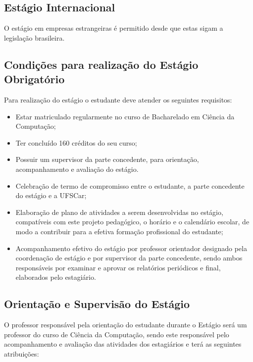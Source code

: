  
\subsection{Estágio Internacional}
O estágio em empresas estrangeiras é permitido desde que estas sigam a legislação brasileira. 


\subsection{Condições para realização do Estágio Obrigatório}

Para realização do estágio o estudante deve atender os seguintes requisitos:

\begin{itemize}
\item Estar matriculado regularmente no curso de Bacharelado em Ciência da Computação;
\item 	Ter concluído 160 créditos do seu curso;
\item 	Possuir um supervisor da parte concedente, para orientação, acompanhamento e avaliação do estágio.
\item Celebração de termo de compromisso entre o estudante, a parte concedente do estágio e a UFSCar; 
\item Elaboração de plano de atividades a serem desenvolvidas no estágio, compatíveis com este projeto pedagógico, o horário e o calendário escolar, de modo a contribuir para a efetiva formação profissional do estudante;
\item Acompanhamento efetivo do estágio por professor orientador designado pela coordenação de estágio e por supervisor da parte concedente, sendo ambos responsáveis por examinar e aprovar os relatórios periódicos e final, elaborados pelo estagiário.
\end{itemize}


\subsection{Orientação e Supervisão do Estágio}


O professor responsável pela orientação do estudante durante o Estágio será um professor do curso de Ciência da Computação, sendo este responsável pelo acompanhamento e avaliação das atividades dos estagiários e terá as seguintes atribuições:

